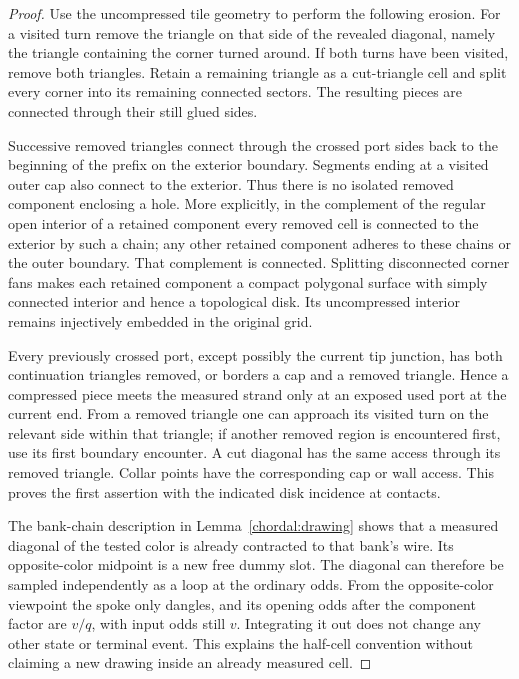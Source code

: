 \begin{proof}
Use the uncompressed tile geometry to perform the following erosion.
For a visited turn remove the triangle on that side of the revealed
diagonal, namely the triangle containing the corner turned around.
If both turns have been visited, remove both triangles.  Retain a
remaining triangle as a cut-triangle cell and split every corner
into its remaining connected sectors.  The resulting pieces are
connected through their still glued sides.

Successive removed triangles connect through the crossed port sides
back to the beginning of the prefix on the exterior boundary.
Segments ending at a visited outer cap also connect to the exterior.
Thus there is no isolated removed component enclosing a hole.
More explicitly, in the complement of the regular open interior of
a retained component every removed cell is connected to the exterior
by such a chain; any other retained component adheres to these
chains or the outer boundary.  That complement is connected.
Splitting disconnected corner fans makes each retained component a
compact polygonal surface with simply connected interior and hence
a topological disk.  Its uncompressed interior remains injectively
embedded in the original grid.

Every previously crossed port, except possibly the current tip
junction, has both continuation triangles removed, or borders a cap
and a removed triangle.  Hence a compressed piece meets the measured
strand only at an exposed used port at the current end.  From a
removed triangle one can approach its visited turn on the relevant
side within that triangle; if another removed region is encountered
first, use its first boundary encounter.  A cut diagonal has the
same access through its removed triangle.  Collar points have the
corresponding cap or wall access.  This proves the first assertion
with the indicated disk incidence at contacts.

The bank-chain description in Lemma~\ref{chordal:drawing} shows
that a measured diagonal of the tested color is already contracted
to that bank's wire.  Its opposite-color midpoint is a new free
dummy slot.  The diagonal can therefore be sampled independently
as a loop at the ordinary odds.  From the opposite-color viewpoint
the spoke only dangles, and its opening odds after the component
factor are $v/q$, with input odds still $v$.  Integrating it out
does not change any other state or terminal event.  This explains
the half-cell convention without claiming a new drawing inside an
already measured cell.


\end{proof}
